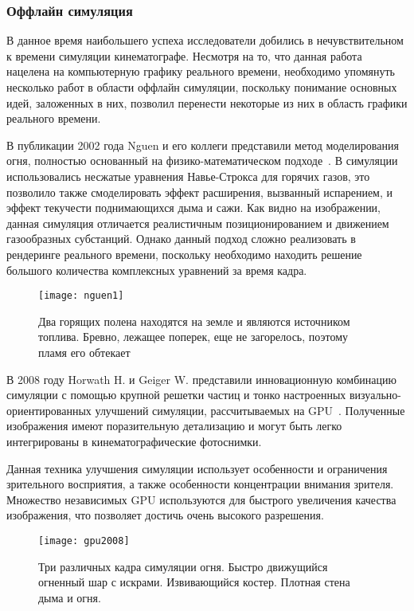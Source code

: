 \subsubsection{Оффлайн симуляция}
В данное время наибольшего успеха исследователи добились в нечувствительном к
времени симуляции кинематографе. Несмотря на то, что данная работа нацелена на
компьютерную графику реального времени, необходимо упомянуть несколько работ в
области оффлайн симуляции, поскольку понимание основных идей, заложенных в них,
позволил перенести некоторые из них в область графики реального времени.

В публикации 2002 года Nguen и его коллеги представили метод моделирования огня,
полностью основанный на физико-математическом подходе~\cite{nguen2002}. В
симуляции использовались несжатые уравнения Навье-Строкса для горячих газов, это
позволило также смоделировать эффект расширения, вызванный испарением, и эффект
текучести поднимающихся дыма и сажи. Как видно на изображении, данная симуляция
отличается реалистичным позиционированием и движением газообразных субстанций.
Однако данный подход сложно реализовать в рендеринге реального времени,
поскольку необходимо находить решение большого количества комплексных уравнений
за время кадра.
\begin{figure}[htb]
	\centering
	\texttt{[image: nguen1]}
	\caption{Два горящих полена находятся на земле и являются источником
 топлива. Бревно, лежащее поперек, еще не загорелось, поэтому пламя его обтекает}
\end{figure}

В 2008 году Horwath H. и Geiger W. представили инновационную комбинацию
симуляции с помощью крупной решетки частиц и тонко настроенных
визуально-ориентированных улучшений симуляции, рассчитываемых на
GPU~\cite{Stock:2008:SWF:1400385.1400457}. Полученные
изображения имеют поразительную детализацию и могут быть легко интегрированы в
кинематографические фотоснимки.

Данная техника улучшения симуляции использует особенности и ограничения
зрительного восприятия, а также особенности концентрации внимания зрителя.
Множество независимых GPU используются для быстрого увеличения качества
изображения, что позволяет достичь очень высокого разрешения.
\begin{figure}[htb]
	\centering
	\texttt{[image: gpu2008]}
	\caption{Три различных кадра симуляции огня. Быстро движущийся огненный
	шар с искрами. Извивающийся костер. Плотная стена дыма и огня.}
\end{figure}

